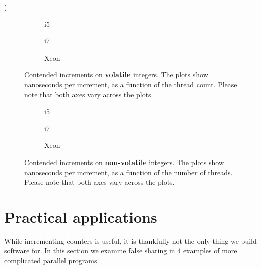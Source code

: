 )

\begin{figure}[hbpt]
	\graphicspath{{plots/}}
	\begin{subfigure}{0.5\textwidth}
		
		\caption{i5}
	\end{subfigure}
	\begin{subfigure}{0.5\textwidth}
		
		\caption{i7}
	\end{subfigure}
	\begin{subfigure}{1\textwidth}
		
		\caption{Xeon}
	\end{subfigure}
	\caption{Contended increments on \textbf{volatile} integers. The plots show
	nanoseconds per increment, as a function of the thread count.
	Please note that both axes vary across the plots.}
	\label{fig:cont}
\end{figure}

\begin{figure}[hbpt]
	\graphicspath{{plots/}}
	\begin{subfigure}{0.5\textwidth}
		
		\caption{i5}
	\end{subfigure}
	\begin{subfigure}{0.5\textwidth}
		
		\caption{i7}
	\end{subfigure}
	\begin{subfigure}{1\textwidth}
		
		\caption{Xeon}
	\end{subfigure}
	\caption{Contended increments on \textbf{non-volatile} integers. The
	plots show nanoseconds per increment, as a function of the number of
	threads. Please note that both axes vary across the plots.}
	\label{fig:cont-nob}
\end{figure}




\section{Practical applications}
While incrementing counters is useful, it is thankfully not the only thing we
build software for.
In this section we examine false sharing in 4 examples of more complicated
parallel programs.

